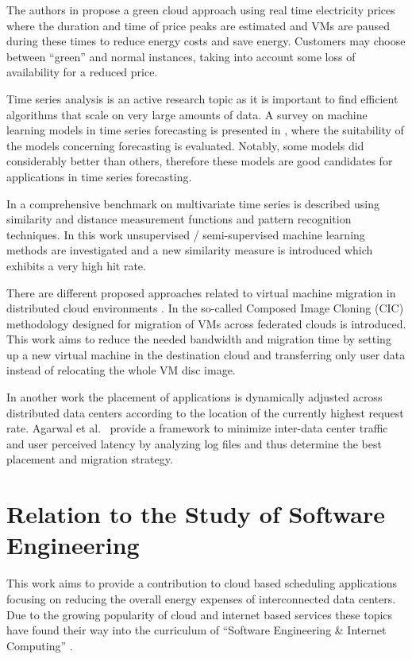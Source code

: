 \documentclass[a4paper]{article}
\begin{document}
The authors in \cite{lucanin2013take} propose a green cloud approach using real time electricity prices where the duration and time of price peaks are estimated and VMs are paused during these times to reduce energy costs and save energy. Customers may choose between ``green'' and normal instances, taking into account some loss of availability for a reduced price. 

Time series analysis is an active research topic as it is important to find efficient algorithms that scale on very large amounts of data. A survey on machine learning models in time series forecasting is presented in \cite{ahmed2010empirical}, where the suitability of the models concerning forecasting is evaluated. Notably, some models did considerably better than others, therefore these models are good candidates for applications in time series forecasting. 

In \cite{lin2011pattern} a comprehensive benchmark on multivariate time series is described using similarity and distance measurement functions and pattern recognition techniques. In this work unsupervised / semi-supervised machine learning methods are investigated and a new similarity measure is introduced which exhibits a very high hit rate. 

There are different proposed approaches related to virtual machine migration in distributed cloud environments \cite{celesti2010improving, malet2010resource}. In \cite{celesti2010improving} the so-called Composed Image Cloning (CIC) methodology designed for migration of VMs across federated clouds is introduced. This work aims to reduce the needed bandwidth and migration time by setting up a new virtual machine in the destination cloud and transferring only user data instead of relocating the whole VM disc image. 

In another work \cite{malet2010resource} the placement of applications is dynamically adjusted across distributed data centers according to the location of the currently highest request rate. Agarwal et al.\ \cite{agarwal2010volley} provide a framework to minimize inter-data center traffic and user perceived latency by analyzing log files and thus determine the best placement and migration strategy. 


\section{Relation to the Study of Software Engineering}

This work aims to provide a contribution to cloud based scheduling applications focusing on reducing the overall energy expenses of interconnected data centers. Due to the growing popularity of cloud and internet based services these topics have found their way into the curriculum of ``Software Engineering \& Internet Computing'' \cite{curriculum2013curriculum}. 
\end{document}
